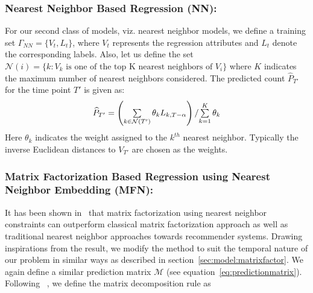 \subsubsection{\label{sec:model:nearestneighbor} Nearest Neighbor Based Regression (NN):}
For our second class of models, viz. nearest neighbor models, we define a training set $\Gamma_{NN}
= \lbrace V_t, L_t \rbrace$, where $V_t$ represents the regression attributes
and $L_t$ denote the corresponding labels.
Also, let us define the set 
$\mathcal{N}(i) = \lbrace k : \mbox{$V_k$ is one of the top  K nearest neighbors of $V_{i}$} \rbrace$ 
where $K$ indicates the maximum number of nearest neighbors considered.
The predicted count $\widehat{P}_{T'}$ for the time point $T'$ is given as:
\vspace{-1em}
\begin{equation} \label{eq:nearestneighbor:pred}
  \begin{array}{l}
    \widehat{P}_{T'}  =  \left({\sum\limits_{k \in \mathcal{N}(T')}
  \theta_{k}L_{k,T - \alpha}}\right)
    /{\sum\limits_{k=1}^{K} \theta_{k}}\\
  \end{array}
\vspace{-0.6em}
\end{equation}
\noindent
Here $\theta_k$ indicates the weight assigned to the $k^{th}$ nearest neighbor.
Typically the inverse Euclidean distances to $V_{T'}$ are chosen as the weights.
\vspace{-1em}
\subsubsection{\label{sec:model:nearestmatrix} Matrix Factorization Based
Regression using Nearest Neighbor Embedding (MFN):}
It has been shown in~\cite{koren2008factor} that matrix factorization using nearest neighbor constraints can
outperform classical matrix factorization approach as well as traditional nearest neighbor approaches towards
recommender systems. Drawing inspirations from the result, we modify the method to suit the temporal nature of our problem in similar ways 
as described in section~\ref{sec:model:matrixfactor}. We again define a similar prediction matrix $\mathcal{M}$ 
(see equation~\ref{eq:predictionmatrix}). Following ~\cite{koren2008factor}, we define the 
matrix decomposition rule as 

